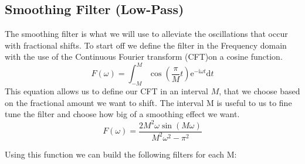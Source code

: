 \documentclass[]{usiinfbachelorproject}
\begin{document}
	
	\subsection{Smoothing Filter (Low-Pass)}
	The smoothing filter is what we will use to alleviate the oscillations that occur with fractional shifts.
	To start off we define the filter in the Frequency domain with the use of the Continuous Fourier transform (CFT)on a cosine function.
	\begin{equation}
		F(\omega) = \int_{-M}^{M} \cos(\frac{\pi}{M}t)\mathrm{e}^{-\mathrm{i}\omega t}\mathrm{d}t
	\end{equation}
	This equation allows us to define our CFT in an interval $M$, that we choose based on the fractional amount we want to shift. The interval M is useful to us to fine tune the filter and choose how big of a smoothing effect we want.
	\begin{equation}\label{filter_formula}
		F(\omega) = \frac{2M^2\omega \sin(M\omega)}{M^2\omega^2-\pi^2}
	\end{equation}
	
	Using this function we can build the following filters for each M:
	
\end{document}
